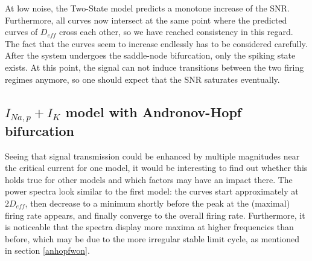 \documentclass[12pt,a4paper]{article}
\begin{document}
At low noise, the Two-State model predicts a monotone increase of the SNR. Furthermore, all curves now intersect at the same point where the predicted curves of $D_{eff}$ cross each other, so we have reached consistency in this regard. The fact that the curves seem to increase endlessly has to be considered carefully. After the system undergoes the saddle-node bifurcation, only the spiking state exists. At this point, the signal can not induce transitions between the two firing regimes anymore, so one should expect that the SNR saturates eventually.
\subsection{$I_{Na,p}+I_K$ model with Andronov-Hopf bifurcation}
Seeing that signal transmission could be enhanced by multiple magnitudes near the critical current for one model, it would be interesting to find out whether this holds true for other models and which factors may have an impact there. The power spectra look similar to the first model: the curves start approximately at $2D_{eff}$, then decrease to a minimum shortly before the peak at the (maximal) firing rate appears, and finally converge to the overall firing rate. Furthermore, it is noticeable that the spectra display more maxima at higher frequencies than before, which may be due to the more irregular stable limit cycle, as mentioned in section \ref{anhopfwon}.
\end{document}
